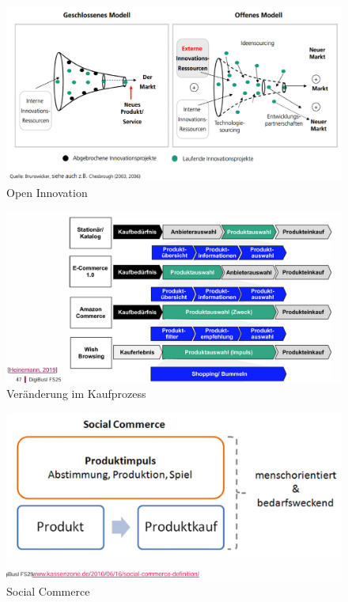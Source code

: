 \documentclass[../Main.tex]{subfiles}
\begin{document}
\begin{figure}[H]
    \centering
    \includegraphics[width=1\linewidth]{Images/digbus/openinnovation.png}
    \caption{Open Innovation}
\end{figure}

\begin{figure}[H]
    \centering
    \includegraphics[width=1\linewidth]{Images/digbus/kaufprozess.png}
    \caption{Veränderung im Kaufprozess}
\end{figure}

\begin{figure}[H]
    \centering
    \includegraphics[width=1\linewidth]{Images/digbus/socialcomm.png}
    \caption{Social Commerce}
\end{figure}
\end{document}

